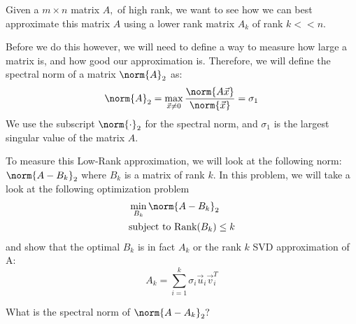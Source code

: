 

Given a $m \times n$ matrix $A,$ of high rank, we want to see how we can best approximate this matrix $A$ using a lower rank matrix $A_{k}$ of rank $k << n.$

Before we do this however, we will need to define a way to measure how large a matrix is, and how good our approximation is. Therefore, we will define the spectral norm of a matrix $\norm{A}_{2}$ as:
\begin{equation}
  \norm{A}_{2} = \max_{\vec{x} \neq 0} \frac{\norm{A \vec{x}}}{\norm{\vec{x}}} = \sigma_{1}
\end{equation}
We use the subscript $\norm{\cdot}_{2}$ for the spectral norm, and $\sigma_{1}$ is the largest singular value of the matrix $A.$

To measure this Low-Rank approximation, we will look at the following norm:
$\norm{A - B_{k}}_{2}$
where $B_{k}$ is a matrix of rank $k.$ In this problem, we will take a look at the following optimization problem
\begin{align*}
  &\min_{B_{k}}{\norm{A - B_{k}}_{2}} \\
  &\text{subject to} \ \text{Rank}(B_k) \leq k
\end{align*}
and show that the optimal $B_{k}$ is in fact $A_{k}$ or the rank $k$ SVD approximation of A:
\begin{equation}
  A_{k} = \sum\limits_{i = 1}^{k} \sigma_{i} \vec{u}_{i} \vec{v}_{i}^{T}
\end{equation}


\begin{enumerate}
  \qitem What is the spectral norm of $\norm{A - A_{k}}_{2}?$

  \ws{
  \vspace{100px}
  }

\end{enumerate}

